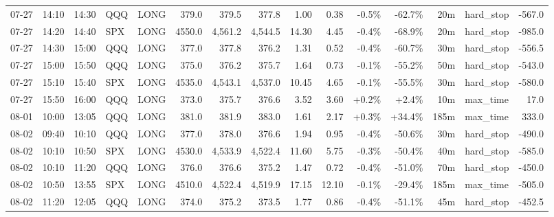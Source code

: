 \documentclass[11pt,a4paper,twoside]{article}
\begin{document}
\begin{landscape}
\begin{center}
\begin{longtable}{>{\color{txtmain}}l l l l l r r r r r r r r >{\color{txtmain}}l r}
07-27 & 14:10 & 14:30 & QQQ & LONG & 379.0 & 379.5 & 377.8 & 1.00 & 0.38 & \textcolor{lossred}{-0.5\%} & \textcolor{lossred}{-62.7\%} & 20m & hard\_stop & \textcolor{lossred}{-567.0} \\
07-27 & 14:20 & 14:40 & SPX & LONG & 4550.0 & 4,561.2 & 4,544.5 & 14.30 & 4.45 & \textcolor{lossred}{-0.4\%} & \textcolor{lossred}{-68.9\%} & 20m & hard\_stop & \textcolor{lossred}{-985.0} \\
07-27 & 14:30 & 15:00 & QQQ & LONG & 377.0 & 377.8 & 376.2 & 1.31 & 0.52 & \textcolor{lossred}{-0.4\%} & \textcolor{lossred}{-60.7\%} & 30m & hard\_stop & \textcolor{lossred}{-556.5} \\
07-27 & 15:00 & 15:50 & QQQ & LONG & 375.0 & 376.2 & 375.7 & 1.64 & 0.73 & \textcolor{lossred}{-0.1\%} & \textcolor{lossred}{-55.2\%} & 50m & hard\_stop & \textcolor{lossred}{-543.0} \\
07-27 & 15:10 & 15:40 & SPX & LONG & 4535.0 & 4,543.1 & 4,537.0 & 10.45 & 4.65 & \textcolor{lossred}{-0.1\%} & \textcolor{lossred}{-55.5\%} & 30m & hard\_stop & \textcolor{lossred}{-580.0} \\
07-27 & 15:50 & 16:00 & QQQ & LONG & 373.0 & 375.7 & 376.6 & 3.52 & 3.60 & \textcolor{wingreen}{+0.2\%} & \textcolor{wingreen}{+2.4\%} & 10m & max\_time & \textcolor{wingreen}{17.0} \\
08-01 & 10:00 & 13:05 & QQQ & LONG & 381.0 & 381.9 & 383.0 & 1.61 & 2.17 & \textcolor{wingreen}{+0.3\%} & \textcolor{wingreen}{+34.4\%} & 185m & max\_time & \textcolor{wingreen}{333.0} \\
08-02 & 09:40 & 10:10 & QQQ & LONG & 377.0 & 378.0 & 376.6 & 1.94 & 0.95 & \textcolor{lossred}{-0.4\%} & \textcolor{lossred}{-50.6\%} & 30m & hard\_stop & \textcolor{lossred}{-490.0} \\
08-02 & 10:10 & 10:50 & SPX & LONG & 4530.0 & 4,533.9 & 4,522.4 & 11.60 & 5.75 & \textcolor{lossred}{-0.3\%} & \textcolor{lossred}{-50.4\%} & 40m & hard\_stop & \textcolor{lossred}{-585.0} \\
08-02 & 10:10 & 11:20 & QQQ & LONG & 376.0 & 376.6 & 375.2 & 1.47 & 0.72 & \textcolor{lossred}{-0.4\%} & \textcolor{lossred}{-51.0\%} & 70m & hard\_stop & \textcolor{lossred}{-450.0} \\
08-02 & 10:50 & 13:55 & SPX & LONG & 4510.0 & 4,522.4 & 4,519.9 & 17.15 & 12.10 & \textcolor{lossred}{-0.1\%} & \textcolor{lossred}{-29.4\%} & 185m & max\_time & \textcolor{lossred}{-505.0} \\
08-02 & 11:20 & 12:05 & QQQ & LONG & 374.0 & 375.2 & 373.5 & 1.77 & 0.86 & \textcolor{lossred}{-0.4\%} & \textcolor{lossred}{-51.1\%} & 45m & hard\_stop & \textcolor{lossred}{-452.5} \\

\end{longtable}
\end{center}
\end{landscape}
\end{document}
